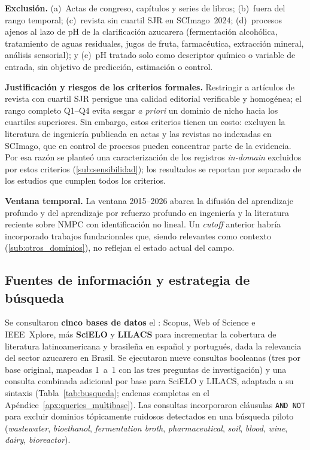\noindent\textbf{Exclusión.}
(a)~Actas de congreso, capítulos y series de libros;
(b)~fuera del rango temporal;
(c)~revista sin cuartil SJR en SCImago~2024;
(d)~procesos ajenos al lazo de pH de la clarificación azucarera
(fermentación alcohólica, tratamiento de aguas residuales, jugos de fruta,
farmacéutica, extracción mineral, análisis sensorial); y
(e)~pH tratado solo como descriptor químico o variable de entrada, sin
objetivo de predicción, estimación o control.

\noindent\textbf{Justificación y riesgos de los criterios formales.}
Restringir a artículos de revista con cuartil SJR persigue una calidad
editorial verificable y homogénea; el rango completo Q1--Q4 evita
sesgar \textit{a priori} un dominio de nicho hacia los cuartiles
superiores. Sin embargo, estos criterios tienen un costo: excluyen la
literatura de ingeniería publicada en actas y las revistas no indexadas
en SCImago, que en control de procesos pueden concentrar parte de la
evidencia. Por esa razón se planteó una caracterización de los
registros \textit{in-domain} excluidos por estos criterios
(\ref{sub:sensibilidad}); los resultados se reportan por separado de los
estudios que cumplen todos los criterios.

\noindent\textbf{Ventana temporal.} La ventana 2015--2026 abarca la
difusión del aprendizaje profundo y del aprendizaje por refuerzo profundo
en ingeniería \parencite{krizhevsky2012imagenet,mnih2015human} y la
literatura reciente sobre NMPC con identificación no lineal. Un
\textit{cutoff} anterior habría incorporado trabajos fundacionales que,
siendo relevantes como contexto (\ref{sub:otros_dominios}), no reflejan
el estado actual del campo.

\subsection{Fuentes de información y estrategia de búsqueda}
\label{sub:fuentes}

Se consultaron \textbf{cinco bases de datos} el \FechaBusqueda:
Scopus, Web of Science e IEEE~Xplore, más \textbf{SciELO} y \textbf{LILACS}
para incrementar la cobertura de literatura latinoamericana y brasileña en
español y portugués, dada la relevancia del sector azucarero en Brasil.
Se ejecutaron nueve consultas booleanas (tres por base original, mapeadas
1~a~1 con las tres preguntas de investigación) y una consulta combinada
adicional por base para SciELO y LILACS, adaptada a su sintaxis
(Tabla~\ref{tab:busqueda}; cadenas completas en el
Apéndice~\ref{apx:queries_multibase}). Las consultas incorporaron cláusulas
\texttt{AND~NOT} para excluir dominios tópicamente ruidosos detectados en
una búsqueda piloto (\textit{wastewater}, \textit{bioethanol},
\textit{fermentation broth}, \textit{pharmaceutical}, \textit{soil},
\textit{blood}, \textit{wine}, \textit{dairy}, \textit{bioreactor}).

